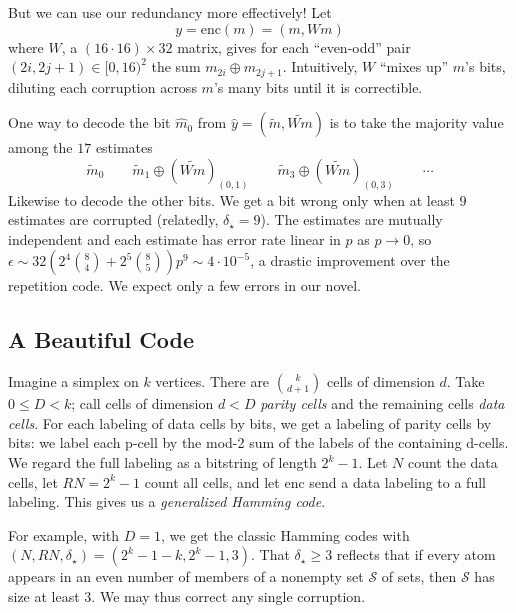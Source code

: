 \documentclass[12pt]{article}
\newcommand{\msec}[1]{\subsection*{\color{mblu}\textsf{#1}}}
\newcommand{\mpar}[1]{%
    \makebox[0cm]{\hspace{-4.75cm}\parbox{2.5cm}{\raggedleft\color{mblulite}\textsf{#1}}}%
}
\newcommand{\Ss}{\mathcal{S}}
\theoremstyle{definition}
\newcommand{\enc}{\text{enc}}
\begin{document}
    \mpar{pairwise}%
    But we can use our redundancy more effectively!  Let
    $$
        y=\enc(m)=(m,Wm)
    $$
    where $W$, a $(16\cdot 16)\times 32$ matrix, gives for each ``even-odd''
    pair $(2i,2j+1) \in [0,16)^2$ the sum $m_{2i}\oplus m_{2j+1}$.  Intuitively, $W$
    ``mixes up'' $m$'s bits, diluting each corruption across $m$'s many bits
    until it is correctible.

    One way to decode the bit $\hat m_0$ from $\hat y = (\tilde m,
    \tilde{Wm})$ is to take the majority value among the $17$ estimates
    $$
        \tilde m_0
        \quad
        \quad
        \tilde m_1\oplus (\widetilde{Wm})_{(0,1)}
        \quad
        \quad
        \tilde m_3\oplus (\widetilde{Wm})_{(0,3)}
        \quad
        \quad
        \cdots
    $$
    Likewise to decode the other bits.
    We get a bit wrong only when at least $9$ estimates are corrupted
    (relatedly, $\delta_\star=9$).  The estimates are mutually independent and
    each estimate has error rate linear in $p$ as $p\to 0$, so $\epsilon \sim
    32\left(2^4{8\choose 4} + 2^5{8\choose 5}\right) p^9 \sim 4 \cdot 10^{-5}$, a
    drastic improvement over the repetition code.  We expect only a few errors
    in our novel.


\msec{A Beautiful Code}

    \indent\par
    \mpar{hamming}
    Imagine a simplex on $k$ vertices.  There are ${k \choose d+1}$ cells
    of dimension $d$.  Take $0\leq D<k$; call cells of dimension $d<D$
    \emph{parity cells} and the remaining cells \emph{data cells}.
    For each labeling of data cells by bits, we get a labeling of parity cells
    by bits: we label each p-cell by the mod-2 sum of the labels of the
    containing d-cells.
    We regard the full labeling as a bitstring of
    length $2^k-1$.  Let $N$ count the data cells, let $RN = 2^k-1$ count all
    cells, and let $\enc$ send a data labeling to a full labeling.  This
    gives us a \emph{generalized Hamming code}.

    For example, with $D=1$, we get the classic Hamming codes with
    $(N,RN,\delta_\star) = (2^k-1-k,2^k-1,3)$.  That $\delta_\star\geq 3$
    reflects that if every atom appears in an even number of members of a
    nonempty set $\Ss$ of sets, then $\Ss$ has size at least $3$.  We may thus
    correct any single corruption.
\end{document}
